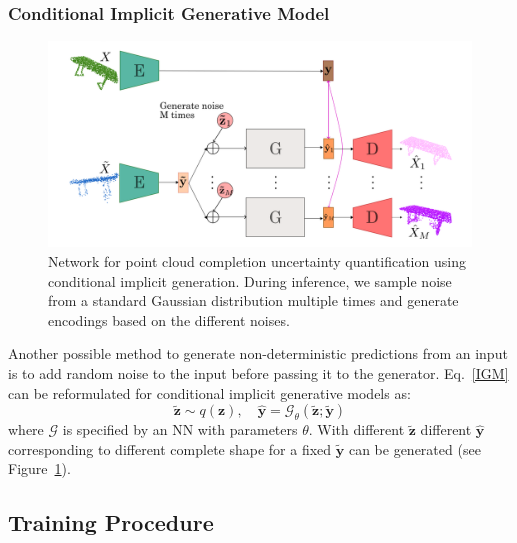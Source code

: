         \subsubsection{Conditional Implicit Generative Model}
        \begin{figure}[htb]
          \begin{center}
          \includegraphics[width=\linewidth]{figures/implicit_gen_network.png}
          \end{center}
          \caption{Network for point cloud completion uncertainty quantification using conditional implicit generation. During inference, we sample noise from a standard Gaussian distribution multiple times and generate encodings based on the different noises.}\label{fig:implicit_net}
        \end{figure}
        Another possible method to generate non-deterministic predictions from an input is to add random noise to the input before passing it to the generator. Eq.~\ref{IGM} can be reformulated for conditional implicit generative models as:
        \begin{equation}\label{IGM}
            \mathbf{\tilde{z}} \sim q(\mathbf{z}), \quad \mathbf{\hat{y}} =  \mathcal{G}_\theta(\mathbf{\tilde{z}}; \mathbf{\tilde{y}})
        \end{equation}
        where $\mathcal{G}$ is specified by an NN with parameters $\theta$. With different $\mathbf{\tilde{z}}$ different $\mathbf{\hat{y}}$ corresponding to different complete shape for a fixed $\mathbf{\tilde{y}}$ can be generated (see Figure~\ref{fig:implicit_net}).

    \subsection{Training Procedure}
